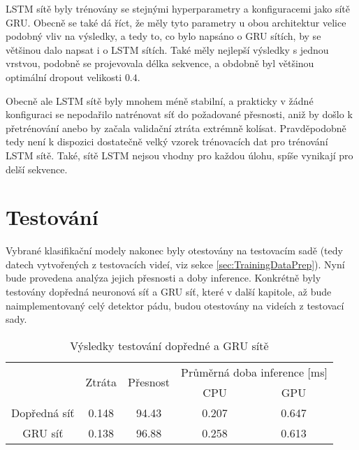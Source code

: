 LSTM sítě byly trénovány se stejnými hyperparametry a konfiguracemi jako sítě
GRU. Obecně se také dá říct, že měly tyto parametry u obou architektur velice
podobný vliv na výsledky, a tedy to, co bylo napsáno o GRU sítích, by se
většinou dalo napsat i o LSTM sítích. Také měly nejlepší výsledky s jednou
vrstvou, podobně se projevovala délka sekvence, a obdobně byl většinou
optimální dropout velikosti $0.4$.

Obecně ale LSTM sítě byly mnohem méně stabilní, a prakticky v žádné konfiguraci
se nepodařilo natrénovat síť do požadované přesnosti, aniž by došlo k
přetrénování anebo by začala validační ztráta extrémně kolísat. Pravděpodobně
tedy není k dispozici dostatečně velký vzorek trénovacích dat pro trénování
LSTM sítě. Také, sítě LSTM nejsou vhodny pro každou úlohu, spíše vynikají pro
delší sekvence.

\section{Testování}
\label{sec:testing}

Vybrané klasifikační modely nakonec byly otestovány na testovacím sadě (tedy
datech vytvořených z testovacích videí, viz sekce \ref{sec:TrainingDataPrep}).
Nyní bude provedena analýza jejich přesnosti a doby inference. Konkrétně byly
testovány dopředná neuronová síť a GRU síť, které v další kapitole, až bude
naimplementovaný celý detektor pádu, budou otestovány na videích z testovací
sady.

\begin{table}[htbp]
    \centering
    \caption{Výsledky testování dopředné a GRU sítě}
    \label{tab:testing}
    \begin{tabular}{|c|c|c|cc|}
        \hline
        \multirow{2}{*}{} & \multirow{2}{*}{Ztráta} & \multirow{2}{*}{Přesnost} & \multicolumn{2}{c|}{Průměrná doba inference [ms]}         \\ \cline{4-5}
                          &                         &                           & \multicolumn{1}{c|}{  CPU  }                      & GPU   \\ \hline
        Dopředná síť      & 0.148                   & 94.43                     & \multicolumn{1}{c|}{0.207}                        & 0.647 \\ \hline
        GRU síť           & 0.138                   & 96.88                     & \multicolumn{1}{c|}{0.258}                        & 0.613 \\ \hline
    \end{tabular}
\end{table}

